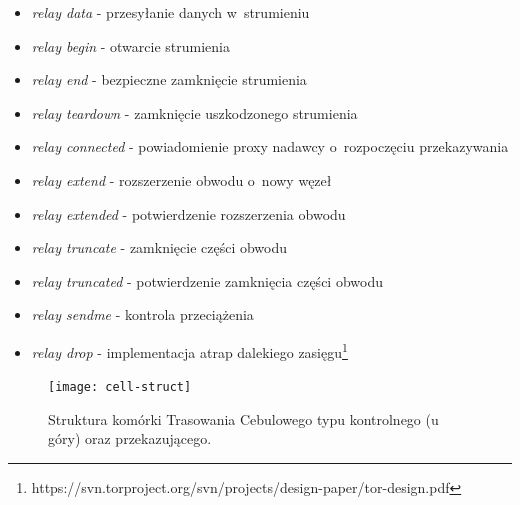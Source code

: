\begin{itemize}
\setlength\itemsep{0mm}
 \item \textit{relay data} - przesyłanie danych w~strumieniu
 \item \textit{relay begin} - otwarcie strumienia
 \item \textit{relay end} - bezpieczne zamknięcie strumienia
 \item \textit{relay teardown} - zamknięcie uszkodzonego strumienia
 \item \textit{relay connected} - powiadomienie proxy nadawcy o~rozpoczęciu przekazywania
 \item \textit{relay extend} - rozszerzenie obwodu o~nowy węzeł
 \item \textit{relay extended} - potwierdzenie rozszerzenia obwodu
 \item \textit{relay truncate} - zamknięcie części obwodu
 \item \textit{relay truncated} - potwierdzenie zamknięcia części obwodu
 \item \textit{relay sendme} - kontrola przeciążenia
 \item \textit{relay drop} - implementacja atrap dalekiego zasięgu\footnote{https://svn.torproject.org/svn/projects/design-paper/tor-design.pdf\label{link:tor-design}}
\end{itemize}

\begin{figure}
 \centering
 \texttt{[image: cell-struct]}
 \caption[Caption for LOR]{Struktura komórki Trasowania Cebulowego typu kontrolnego (u góry) oraz przekazującego.\footnotemark}
 \label{rys:cell}
\end{figure}


